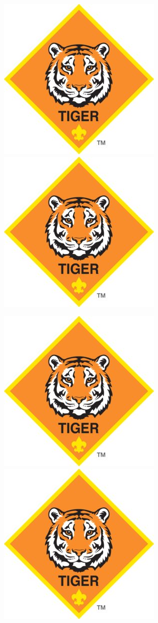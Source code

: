 \documentclass[12pt]{article}
\begin{document}
\noindent\includegraphics[width = .5\textwidth]{TIGER-logo.jpg}\qquad\includegraphics[width = .5\textwidth]{TIGER-logo.jpg}

\noindent\includegraphics[width = .5\textwidth]{TIGER-logo.jpg}\qquad\includegraphics[width = .5\textwidth]{TIGER-logo.jpg}
\end{document}
